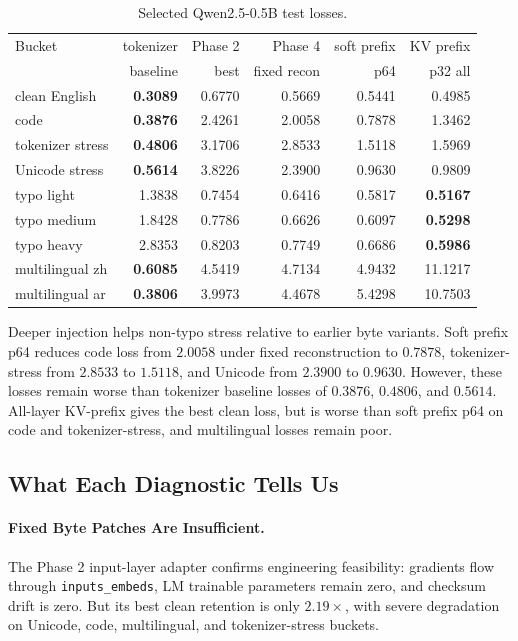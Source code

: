 \documentclass[runningheads]{llncs}
\newcommand{\qwen}{Qwen2.5-0.5B}
\begin{document}
\begin{table}[t]
\centering
\caption{Selected \qwen{} test losses.}
\label{tab:buckets}
\small
\setlength{\tabcolsep}{3.3pt}
\begin{tabular}{lrrrrr}
\toprule
Bucket & tokenizer & Phase 2 & Phase 4 & soft prefix & KV prefix \\
 & baseline & best & fixed recon & p64 & p32 all \\
\midrule
clean English & \textbf{0.3089} & 0.6770 & 0.5669 & 0.5441 & 0.4985 \\
code & \textbf{0.3876} & 2.4261 & 2.0058 & 0.7878 & 1.3462 \\
tokenizer stress & \textbf{0.4806} & 3.1706 & 2.8533 & 1.5118 & 1.5969 \\
Unicode stress & \textbf{0.5614} & 3.8226 & 2.3900 & 0.9630 & 0.9809 \\
typo light & 1.3838 & 0.7454 & 0.6416 & 0.5817 & \textbf{0.5167} \\
typo medium & 1.8428 & 0.7786 & 0.6626 & 0.6097 & \textbf{0.5298} \\
typo heavy & 2.8353 & 0.8203 & 0.7749 & 0.6686 & \textbf{0.5986} \\
multilingual zh & \textbf{0.6085} & 4.5419 & 4.7134 & 4.9432 & 11.1217 \\
multilingual ar & \textbf{0.3806} & 3.9973 & 4.4678 & 5.4298 & 10.7503 \\
\bottomrule
\end{tabular}
\end{table}

Deeper injection helps non-typo stress relative to earlier byte variants. Soft prefix p64 reduces code loss from $2.0058$ under fixed reconstruction to $0.7878$, tokenizer-stress from $2.8533$ to $1.5118$, and Unicode from $2.3900$ to $0.9630$. However, these losses remain worse than tokenizer baseline losses of $0.3876$, $0.4806$, and $0.5614$. All-layer KV-prefix gives the best clean loss, but is worse than soft prefix p64 on code and tokenizer-stress, and multilingual losses remain poor.

\subsection{What Each Diagnostic Tells Us}

\paragraph{Fixed Byte Patches Are Insufficient.}
The Phase 2 input-layer adapter confirms engineering feasibility: gradients flow through \texttt{inputs\_embeds}, LM trainable parameters remain zero, and checksum drift is zero. But its best clean retention is only $2.19\times$, with severe degradation on Unicode, code, multilingual, and tokenizer-stress buckets.
\end{document}
